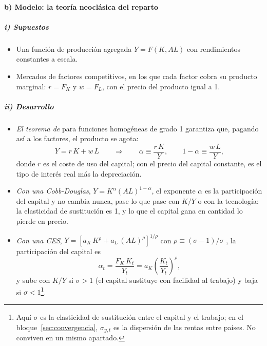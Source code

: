 \documentclass[11pt]{article}
\begin{document}
\paragraph{b) Modelo: la teoría neoclásica del reparto}

\subparagraph{i) Supuestos}

\begin{itemize}
\item Una función de producción agregada $Y=F(K,AL)$ con rendimientos constantes a escala.
\item Mercados de factores competitivos, en los que cada factor cobra su producto marginal: $r=F_K$ y $w=F_L$, con el precio del producto igual a 1.
\end{itemize}

\subparagraph{ii) Desarrollo}

\begin{itemize}
\item \emph{El teorema de } para funciones homogéneas de grado 1  garantiza que, pagando así a los factores, el producto se agota:
  \begin{equation}
  Y=r\,K+w\,L\qquad\Longrightarrow\qquad \alpha\equiv\frac{r\,K}{Y},\qquad 1-\alpha\equiv\frac{w\,L}{Y},\label{eq:euler-participaciones}
  \end{equation}
  donde $r$ es el coste de uso del capital; con el precio del capital constante, es el tipo de interés real más la depreciación.
\item \emph{Con una Cobb-Douglas}, $Y=K^{\alpha}(AL)^{1-\alpha}$, el exponente $\alpha$ es la participación del capital y no cambia nunca, pase lo que pase con $K/Y$ o con la tecnología: la elasticidad de sustitución es 1, y lo que el capital gana en cantidad lo pierde en precio.
\item \emph{Con una CES}, $Y=\left[a_K\,K^{\rho}+a_L\,(AL)^{\rho}\right]^{1/\rho}$ con $\rho\equiv(\sigma-1)/\sigma$ , la participación del capital es
  \begin{equation}
  \alpha_t=\frac{F_K\,K_t}{Y_t}=a_K\left(\frac{K_t}{Y_t}\right)^{\rho},\label{eq:ces-participacion}
  \end{equation}
  y sube con $K/Y$ si $\sigma>1$ (el capital sustituye con facilidad al trabajo) y baja si $\sigma<1$\footnote{Aquí $\sigma$ es la elasticidad de sustitución entre el capital y el trabajo; en el bloque~\ref{sec:convergencia}, $\sigma_{y,t}$ es la dispersión de las rentas entre países. No conviven en un mismo apartado.}.
\end{itemize}
\end{document}
